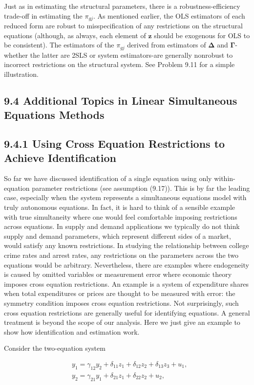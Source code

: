 \documentclass[10pt]{article}
\begin{document}
Just as in estimating the structural parameters, there is a robustness-efficiency trade-off in estimating the $\pi_{g j}$. As mentioned earlier, the OLS estimators of each reduced form are robust to misspecification of any restrictions on the structural equations (although, as always, each element of $\mathbf{z}$ should be exogenous for OLS to be consistent). The estimators of the $\pi_{g j}$ derived from estimators of $\boldsymbol{\Delta}$ and $\boldsymbol{\Gamma}$-whether the latter are 2SLS or system estimators-are generally nonrobust to incorrect restrictions on the structural system. See Problem 9.11 for a simple illustration.

\subsection*{9.4 Additional Topics in Linear Simultaneous Equations Methods}
\subsection*{9.4.1 Using Cross Equation Restrictions to Achieve Identification}
So far we have discussed identification of a single equation using only within-equation parameter restrictions (see assumption (9.17)). This is by far the leading case, especially when the system represents a simultaneous equations model with truly autonomous equations. In fact, it is hard to think of a sensible example with true simultaneity where one would feel comfortable imposing restrictions across equations. In supply and demand applications we typically do not think supply and demand parameters, which represent different sides of a market, would satisfy any known restrictions. In studying the relationship between college crime rates and arrest rates, any restrictions on the parameters across the two equations would be arbitrary. Nevertheless, there are examples where endogeneity is caused by omitted variables or measurement error where economic theory imposes cross equation restrictions. An example is a system of expenditure shares when total expenditures or prices are thought to be measured with error: the symmetry condition imposes cross equation restrictions. Not surprisingly, such cross equation restrictions are generally useful for identifying equations. A general treatment is beyond the scope of our analysis. Here we just give an example to show how identification and estimation work.

Consider the two-equation system


\begin{align*}
& y_{1}=\gamma_{12} y_{2}+\delta_{11} z_{1}+\delta_{12} z_{2}+\delta_{13} z_{3}+u_{1},  \tag{9.31}\\
& y_{2}=\gamma_{21} y_{1}+\delta_{21} z_{1}+\delta_{22} z_{2}+u_{2}, \tag{9.32}
\end{align*}
\end{document}
